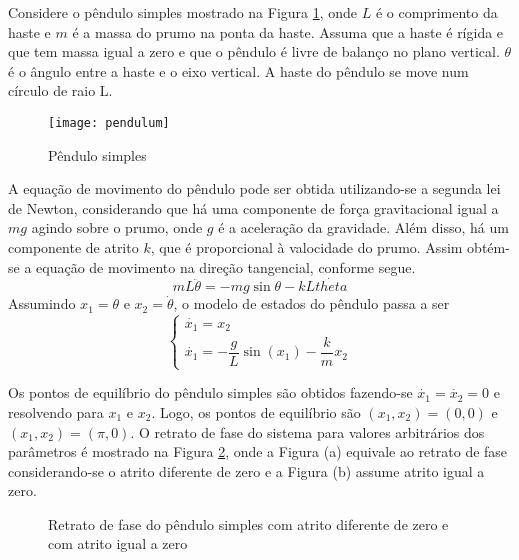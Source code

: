 \begin{example}  Considere o pêndulo simples mostrado na Figura \ref{fig:pendulo}, onde $L$ é o comprimento da haste e $m$ é a massa do prumo na ponta da haste. Assuma que a haste é rígida e que tem massa igual a zero e que o pêndulo é livre de balanço no plano vertical. $\theta$ é o ângulo entre a haste e o eixo vertical. A haste do pêndulo se move num círculo de raio L. 

\begin{figure}[htbp]
	\centering
	\texttt{[image: pendulum]}
	\caption{Pêndulo simples}
	 \label{fig:pendulo}
\end{figure}

A equação de movimento do pêndulo pode ser obtida utilizando-se a segunda lei de Newton, considerando que há uma componente de força gravitacional igual a $mg$ agindo sobre o prumo, onde $g$ é a aceleração da gravidade. Além disso, há um componente de atrito $k$, que é proporcional \`{a} valocidade do prumo. Assim obtém-se a equação de movimento na direção tangencial, conforme segue.
\begin{equation*} mL\ddot{\theta} = -mg\sin\theta - kL\dot{theta}
\end{equation*}
Assumindo $x_1 = \theta$ e $x_2 = \dot{\theta}$, o modelo de estados do pêndulo passa a ser
\begin{equation*}
\begin{cases}\dot{x_1} = x_2\\\dot{x_1} = -\dfrac{g}{L} \sin(x_1) - \dfrac{k}{m} x_2
\end{cases}
\end{equation*}

Os pontos de equilíbrio do pêndulo simples são obtidos fazendo-se $\dot{x_1} = \dot{x_2} = 0$ e resolvendo para $x_1$ e $x_2$. Logo, os pontos de equilíbrio são $(x_1,x_2) = (0,0)$ e $(x_1, x_2) = (\pi,0)$. O retrato de fase do sistema para valores arbitrários dos parâmetros é mostrado na Figura \ref{fig:pendulo_retrato_fase}, onde a Figura (a) equivale ao retrato de fase considerando-se o atrito diferente de zero e a Figura (b) assume atrito igual a zero.

\begin{figure}[htbp]
	\centering
	\qquad
	\caption{Retrato de fase do pêndulo simples com atrito diferente de zero e com atrito igual a zero}
	\label{fig:pendulo_retrato_fase}
\end{figure}

\end{example}\label{ex:pendulo_simples}


